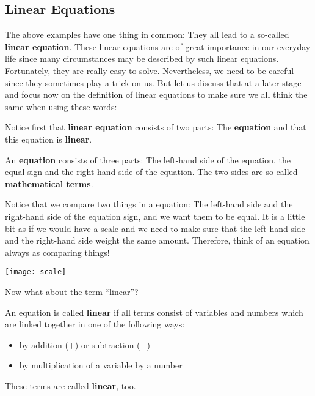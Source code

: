 
\subsection{Linear Equations}

The above examples have one thing in common: They all lead to a so-called \textbf{linear equation}. These linear equations are of great importance in our everyday life since many circumstances may be described by such linear equations. Fortunately, they are really easy to solve. Nevertheless, we need to be careful since they sometimes play a trick on us. But let us discuss that at a later stage and focus now on the definition of linear equations to make sure we all think the same when using these words:  

\vsp

Notice first that \textbf{linear equation} consists of two parts: The \textbf{equation} and that this equation is \textbf{linear}. 
\vsp

\begin{tcolorbox}[colback=white]
\begin{definition}
An \textbf{equation} consists of three parts: The left-hand side of the equation, the equal sign and the right-hand side of the equation. The two sides are so-called \textbf{mathematical terms}. 
\end{definition}
\end{tcolorbox}
\vsp

Notice that we compare two things in a equation: The left-hand side and the right-hand side of the equation sign, and we want them to be equal. It is a little bit as if we would have a scale and we need to make sure that the left-hand side and the right-hand side weight the same amount. Therefore, think of an equation always as comparing things!

\begin{center}
\texttt{[image: scale]}
\end{center}
\vsp

Now what about the term ``linear''?
\vsp

\begin{tcolorbox}[colback=white]
\begin{definition}
An equation is called \textbf{linear} if all terms consist of variables and numbers which are linked together in one of the following ways:
\begin{itemize}
\item by addition ($+$) or subtraction ($-$)
\item by multiplication of a variable by a number
\end{itemize}
These terms are called \textbf{linear}, too.
\end{definition}
\end{tcolorbox}


